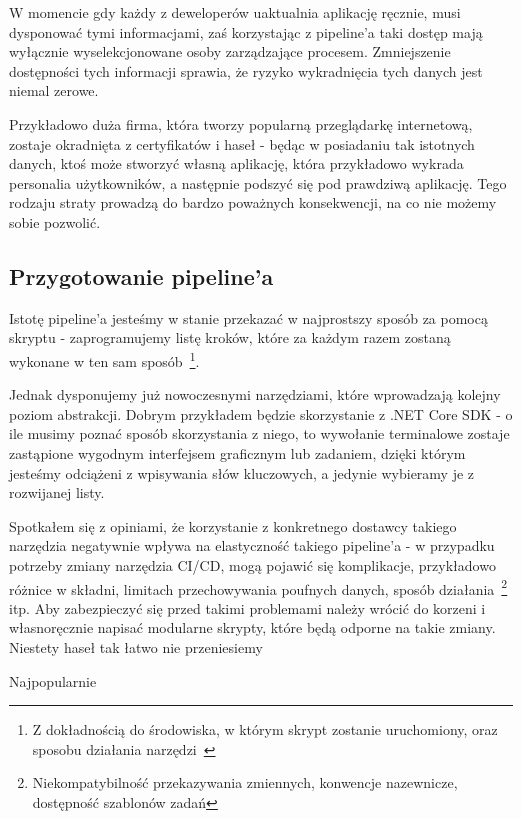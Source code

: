 W momencie gdy każdy z deweloperów uaktualnia aplikację ręcznie, musi dysponować tymi informacjami,
zaś korzystając z pipeline'a taki dostęp mają wyłącznie wyselekcjonowane osoby zarządzające procesem.
Zmniejszenie dostępności tych informacji sprawia, że ryzyko wykradnięcia tych danych jest niemal zerowe.

Przykładowo duża firma, która tworzy popularną przeglądarkę internetową, zostaje okradnięta z certyfikatów i haseł - 
będąc w posiadaniu tak istotnych danych, ktoś może stworzyć własną aplikację, która przykładowo wykrada personalia użytkowników, 
a następnie podszyć się pod prawdziwą aplikację. 
Tego rodzaju straty prowadzą do bardzo poważnych konsekwencji, na co nie możemy sobie pozwolić.
\newpage

\subsection[pipelinePreparation]{Przygotowanie pipeline'a}
Istotę pipeline'a jesteśmy w stanie przekazać w najprostszy sposób za pomocą skryptu - 
zaprogramujemy listę kroków, które za każdym razem zostaną wykonane w ten sam sposób~\footnote{
    Z dokładnością do środowiska, w którym skrypt zostanie uruchomiony, oraz sposobu działania narzędzi~\cite{compilerDeterminism}
}.


Jednak dysponujemy już nowoczesnymi narzędziami, które wprowadzają kolejny poziom abstrakcji.
Dobrym przykładem będzie skorzystanie z .NET Core SDK - o ile musimy poznać sposób skorzystania z niego,
to wywołanie terminalowe zostaje zastąpione wygodnym interfejsem graficznym lub zadaniem, dzięki którym jesteśmy 
odciążeni z wpisywania słów kluczowych, a jedynie wybieramy je z rozwijanej listy.

Spotkałem się z opiniami, że korzystanie z konkretnego dostawcy takiego narzędzia negatywnie wpływa na elastyczność 
takiego pipeline'a - w przypadku potrzeby zmiany narzędzia CI/CD, mogą pojawić się komplikacje, 
przykładowo różnice w składni, limitach przechowywania poufnych danych, sposób działania~\footnote{
    Niekompatybilność przekazywania zmiennych, konwencje nazewnicze, dostępność szablonów zadań
} itp.
Aby zabezpieczyć się przed takimi problemami należy wrócić do korzeni i własnoręcznie napisać modularne skrypty,
które będą odporne na takie zmiany. 
Niestety haseł tak łatwo nie przeniesiemy 

Najpopularnie
